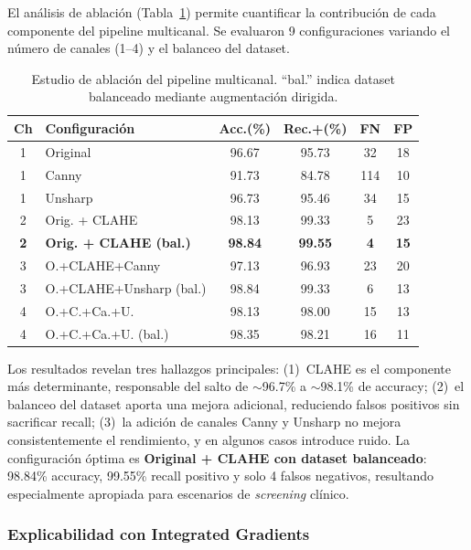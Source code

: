 \documentclass[conference]{IEEEtran}
\begin{document}
El an\'{a}lisis de ablaci\'{o}n (Tabla~\ref{tab:ablacion}) permite cuantificar
la contribuci\'{o}n de cada componente del pipeline multicanal. Se evaluaron
9 configuraciones variando el n\'{u}mero de canales (1--4) y el balanceo del
dataset.

\begin{table}[t]
\caption{Estudio de ablaci\'{o}n del pipeline multicanal. ``bal.'' indica
dataset balanceado mediante augmentaci\'{o}n dirigida.}
\label{tab:ablacion}
\centering
\footnotesize
\setlength{\tabcolsep}{2pt}
\begin{tabular}{clcccc}
\toprule
\textbf{Ch} & \textbf{Configuraci\'{o}n} & \textbf{Acc.(\%)} & \textbf{Rec.+(\%)} & \textbf{FN} & \textbf{FP} \\
\midrule
1 & Original              & 96.67 & 95.73 & 32 & 18 \\
1 & Canny                 & 91.73 & 84.78 & 114 & 10 \\
1 & Unsharp               & 96.73 & 95.46 & 34 & 15 \\
2 & Orig. + CLAHE         & 98.13 & 99.33 & 5 & 23 \\
\textbf{2} & \textbf{Orig. + CLAHE (bal.)} & \textbf{98.84} & \textbf{99.55} & \textbf{4} & \textbf{15} \\
3 & O.+CLAHE+Canny        & 97.13 & 96.93 & 23 & 20 \\
3 & O.+CLAHE+Unsharp (bal.) & 98.84 & 99.33 & 6 & 13 \\
4 & O.+C.+Ca.+U.          & 98.13 & 98.00 & 15 & 13 \\
4 & O.+C.+Ca.+U. (bal.)   & 98.35 & 98.21 & 16 & 11 \\
\bottomrule
\end{tabular}
\end{table}

Los resultados revelan tres hallazgos principales: (1)~CLAHE es el componente
m\'{a}s determinante, responsable del salto de $\sim$96.7\% a $\sim$98.1\%
de accuracy; (2)~el balanceo del dataset aporta una mejora adicional,
reduciendo falsos positivos sin sacrificar recall; (3)~la adici\'{o}n de
canales Canny y Unsharp no mejora consistentemente el rendimiento, y en
algunos casos introduce ruido. La configuraci\'{o}n \'{o}ptima es
\textbf{Original + CLAHE con dataset balanceado}: 98.84\% accuracy, 99.55\%
recall positivo y solo 4 falsos negativos, resultando especialmente apropiada
para escenarios de \textit{screening} cl\'{i}nico.

\subsubsection{Explicabilidad con Integrated Gradients}
\end{document}
